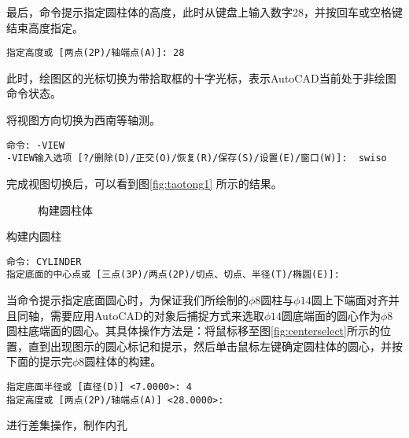 \begin{procedure}
最后，命令提示指定圆柱体的高度，此时从键盘上输入数字28，并按回车或空格键结束高度指定。
\begin{lstlisting}
指定高度或 [两点(2P)/轴端点(A)]: 28
\end{lstlisting}

此时，绘图区的光标切换为带拾取框的十字光标，表示AutoCAD当前处于非绘图命令状态。
\item 将视图方向切换为西南等轴测。
\begin{lstlisting}
命令: -VIEW
-VIEW输入选项 [?/删除(D)/正交(O)/恢复(R)/保存(S)/设置(E)/窗口(W)]:  swiso
\end{lstlisting}

完成视图切换后，可以看到图\ref{fig:taotong1} 所示的结果。
\begin{figure}[htbp]
\centering
{}\hspace{20pt}
\hspace{20pt}
\caption{构建圆柱体}
\end{figure}

\item 构建内圆柱
\begin{lstlisting}
命令: CYLINDER
指定底面的中心点或 [三点(3P)/两点(2P)/切点、切点、半径(T)/椭圆(E)]:
\end{lstlisting}

当命令提示指定底面圆心时，为保证我们所绘制的$\phi 8$圆柱与$\phi 14$圆上下端面对齐并且同轴，需要应用AutoCAD的对象后捕捉方式来选取$\phi 14$圆底端面的圆心作为$\phi 8$圆柱底端面的圆心。其具体操作方法是：将鼠标移至图\ref{fig:centerselect}所示的位置，直到出现图示的圆心标记和提示，然后单击鼠标左键确定圆柱体的圆心，并按下面的提示完$\phi 8$圆柱体的构建。
\begin{lstlisting}
指定底面半径或 [直径(D)] <7.0000>: 4
指定高度或 [两点(2P)/轴端点(A)] <28.0000>:
\end{lstlisting}


\item 进行差集操作，制作内孔


\end{procedure}
